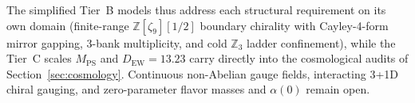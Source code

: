 The simplified Tier~B models thus address each structural requirement on its own domain (finite-range
$\mathbb{Z}[\zeta_9][1/2]$ boundary chirality with Cayley-4-form mirror gapping, 3-bank multiplicity, and cold
$\mathbb{Z}_3$ ladder confinement), while the Tier~C scales $M_{\mathrm{PS}}$ and $D_{\mathrm{EW}} = 13.23$ carry
directly into the cosmological audits of Section~\ref{sec:cosmology}. Continuous non-Abelian gauge fields, interacting
3+1D chiral gauging, and zero-parameter flavor masses and $\alpha(0)$ remain open.
